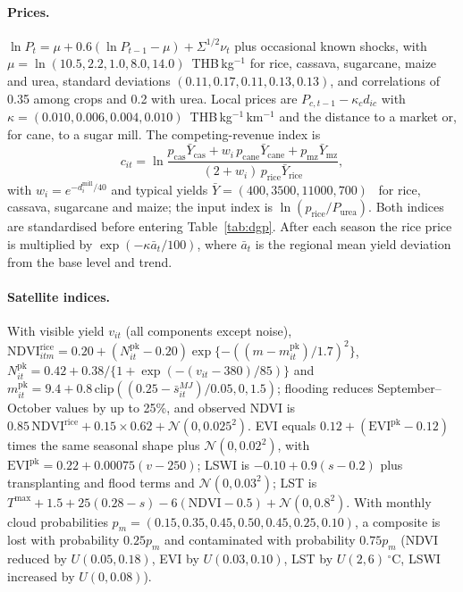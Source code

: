 \paragraph{Prices.} $\ln P_t=\mu+0.6(\ln P_{t-1}-\mu)+\Sigma^{1/2}\nu_t$ plus occasional known shocks, with $\mu=\ln(10.5,\allowbreak 2.2,\allowbreak 1.0,\allowbreak 8.0,\allowbreak 14.0)$~THB\,kg$^{-1}$ for rice, cassava, sugarcane, maize and urea, standard deviations $(0.11,\allowbreak 0.17,\allowbreak 0.11,\allowbreak 0.13,\allowbreak 0.13)$, and correlations of 0.35 among crops and 0.2 with urea. Local prices are $P_{c,t-1}-\kappa_c d_{ic}$ with $\kappa=(0.010,\allowbreak 0.006,\allowbreak 0.004,\allowbreak 0.010)$~THB\,kg$^{-1}$\,km$^{-1}$ and the distance to a market or, for cane, to a sugar mill. The competing-revenue index is
\[ c_{it}=\ln\frac{p_{\mathrm{cas}}\bar Y_{\mathrm{cas}}+w_i\,p_{\mathrm{cane}}\bar Y_{\mathrm{cane}}+p_{\mathrm{mz}}\bar Y_{\mathrm{mz}}}{(2+w_i)\,p_{\mathrm{rice}}\bar Y_{\mathrm{rice}}},\] with $w_i=e^{-d^{\mathrm{mill}}_i/40}$ and typical yields $\bar Y=(400,\allowbreak 3500,\allowbreak 11000,\allowbreak 700)$~\kgrai{} for rice, cassava, sugarcane and maize; the input index is $\ln(p_{\mathrm{rice}}/P_{\mathrm{urea}})$. Both indices are standardised before entering Table~\ref{tab:dgp}. After each season the rice price is multiplied by $\exp(-\kappa\bar a_t/100)$, where $\bar a_t$ is the regional mean yield deviation from the base level and trend.

\paragraph{Satellite indices.} With visible yield $v_{it}$ (all components except noise), $\mathrm{NDVI}^{\mathrm{rice}}_{itm}=0.20+(N^{\mathrm{pk}}_{it}-0.20)\exp\{-((m-m^{\mathrm{pk}}_{it})/1.7)^2\}$, $N^{\mathrm{pk}}_{it}=0.42+0.38/\{1+\exp(-(v_{it}-380)/85)\}$ and $m^{\mathrm{pk}}_{it}=9.4+0.8\,\mathrm{clip}((0.25-\bar s^{MJ}_{it})/0.05,\allowbreak 0,\allowbreak 1.5)$; flooding reduces September--October values by up to 25\%, and observed NDVI is $0.85\,\mathrm{NDVI}^{\mathrm{rice}}+0.15\times0.62+\mathcal N(0,\allowbreak 0.025^2)$. EVI equals $0.12+(\mathrm{EVI}^{\mathrm{pk}}-0.12)$ times the same seasonal shape plus $\mathcal N(0,\allowbreak 0.02^2)$, with $\mathrm{EVI}^{\mathrm{pk}}=0.22+0.00075(v-250)$; LSWI is $-0.10+0.9(s-0.2)$ plus transplanting and flood terms and $\mathcal N(0,\allowbreak 0.03^2)$; LST is $T^{\max}+1.5+25(0.28-s)-6(\mathrm{NDVI}-0.5)+\mathcal N(0,\allowbreak 0.8^2)$. With monthly cloud probabilities $p_m=(0.15,\allowbreak 0.35,\allowbreak 0.45,\allowbreak 0.50,\allowbreak 0.45,\allowbreak 0.25,\allowbreak 0.10)$, a composite is lost with probability $0.25p_m$ and contaminated with probability $0.75p_m$ (NDVI reduced by $U(0.05,\allowbreak 0.18)$, EVI by $U(0.03,\allowbreak 0.10)$, LST by $U(2,\allowbreak 6)$\,$^\circ$C, LSWI increased by $U(0,\allowbreak 0.08)$).


